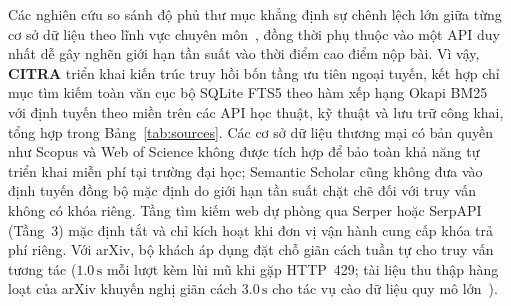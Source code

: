 Các nghiên cứu so sánh độ phủ thư mục khẳng định sự chênh lệch lớn giữa từng cơ sở dữ liệu theo lĩnh vực chuyên môn~\cite{visser2021bibliographic}, đồng thời phụ thuộc vào một API duy nhất dễ gây nghẽn giới hạn tần suất vào thời điểm cao điểm nộp bài. Vì vậy, \textbf{CITRA} triển khai kiến trúc truy hồi bốn tầng ưu tiên ngoại tuyến, kết hợp chỉ mục tìm kiếm toàn văn cục bộ SQLite FTS5 theo hàm xếp hạng Okapi BM25~\cite{robertson2009bm25} với định tuyến theo miền trên các API học thuật, kỹ thuật và lưu trữ công khai, tổng hợp trong Bảng~\ref{tab:sources}. Các cơ sở dữ liệu thương mại có bản quyền như Scopus và Web of Science không được tích hợp để bảo toàn khả năng tự triển khai miễn phí tại trường đại học; Semantic Scholar cũng không đưa vào định tuyến đồng bộ mặc định do giới hạn tần suất chặt chẽ đối với truy vấn không có khóa riêng. Tầng tìm kiếm web dự phòng qua Serper hoặc SerpAPI (Tầng~3) mặc định tắt và chỉ kích hoạt khi đơn vị vận hành cung cấp khóa trả phí riêng. Với arXiv, bộ khách áp dụng đặt chỗ giãn cách tuần tự cho truy vấn tương tác ($1.0\,\text{s}$ mỗi lượt kèm lùi mũ khi gặp HTTP~429; tài liệu thu thập hàng loạt của arXiv khuyến nghị giãn cách $3.0\,\text{s}$ cho tác vụ cào dữ liệu quy mô lớn~\cite{arxiv-api}).

